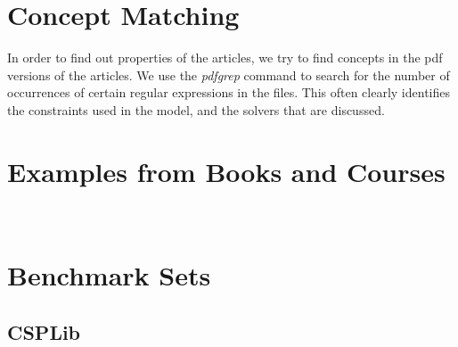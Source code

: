 \documentclass[a4paper]{article}
\begin{document}
\clearpage
\section{Concept Matching}

In order to find out properties of the articles, we try to find concepts in the pdf versions of the articles. We use the \emph{pdfgrep} command to search for the number of occurrences of certain regular expressions in the files. This often clearly identifies the constraints used in the model, and the solvers that are discussed.

%
%
%
%  
%  
%  
%  
%  
%  














\section{Examples from Books and Courses}

\

\section{Benchmark Sets}

\subsection{CSPLib}
\end{document}

